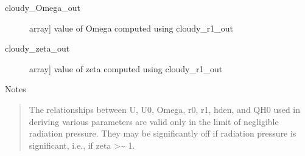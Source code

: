\documentclass[letterpaper,10pt,english]{sphinxmanual}
\begin{document}
\begin{fulllineitems}
\begin{description}
\begin{description}
\item[{cloudy\_Omega\_out}] \leavevmode{[}array{]}
value of Omega computed using cloudy\_r1\_out

\item[{cloudy\_zeta\_out}] \leavevmode{[}array{]}
value of zeta computed using cloudy\_r1\_out

\end{description}

\end{description}

Notes
\begin{quote}

The relationships between U, U0, Omega, r0, r1, hden, and
QH0 used in deriving various parameters are valid only in
the limit of negligible radiation pressure. They may be
significantly off if radiation pressure is significant,
i.e., if zeta \textgreater{}\textasciitilde{} 1.
\end{quote}

\end{fulllineitems}

\end{document}
